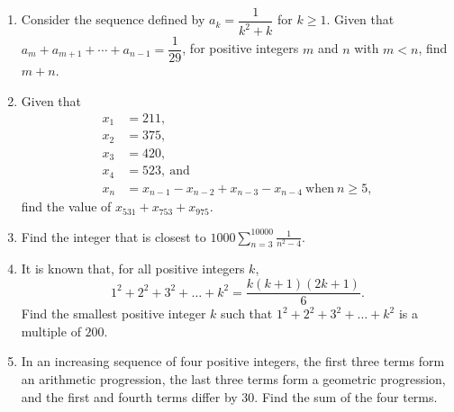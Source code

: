 \documentclass{article}
\begin{document}
\begin{enumerate}
    \item Consider the sequence defined by $a_k =\dfrac{1}{k^2+k}$ for $k\geq 1$. Given that $a_m+a_{m+1}+\cdots+a_{n-1}=\dfrac{1}{29}$, for positive integers $m$ and $n$ with $m<n$, find $m+n$.

    \item Given that\begin{align*}x_{1}&=211,\\ x_{2}&=375,\\ x_{3}&=420,\\ x_{4}&=523,\ \text{and}\\ x_{n}&=x_{n-1}-x_{n-2}+x_{n-3}-x_{n-4}\ \text{when}\ n\geq5, \end{align*}find the value of $x_{531}+x_{753}+x_{975}$.

    \item Find the integer that is closest to $1000\sum_{n=3}^{10000}\frac1{n^2-4}$.

    \item It is known that, for all positive integers $k$, $$1^2+2^2+3^2+\ldots+k^{2}=\frac{k(k+1)(2k+1)}6.$$
    Find the smallest positive integer $k$ such that $1^2+2^2+3^2+\ldots+k^2$ is a multiple of $200$.

    \item In an increasing sequence of four positive integers, the first three terms form an arithmetic progression, the last three terms form a geometric progression, and the first and fourth terms differ by $30$. Find the sum of the four terms.
\end{enumerate}
\end{document}
